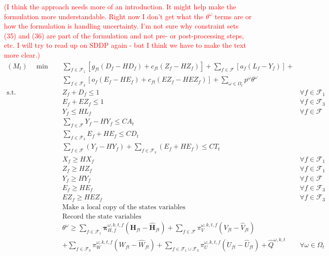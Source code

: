 \documentclass[12pt]{article}
\begin{document}
	\newline
	\textcolor{red}{(I think the approach needs more of an introduction.  It might help make the formulation more understandable.  Right now I don't get what the $\theta^\omega$ terms are or how the formulation is handling uncertainty.  I'm not sure why constraint sets (35) and (36) are part of the formulation and not pre- or post-processing steps, etc.  I will try to read up on SDDP again - but I think we have to make the text more clear.)}
	\begin{align}
		(M_t)\quad \min \quad & \sum_{f \in \mathcal{F}_1} \left[ g_{ft} (D_f - HD_f) + c_{ft} (Z_f - HZ_f) \right] + \sum_{f \in \mathcal{F}} \left[ a_f (L_f - Y_f)\right] + & \nonumber \\
		& \sum_{f \in \mathcal{F}_3} \left[ o_f(E_f - HE_f) + c_{ft}(EZ_f - HEZ_f)\right] + \sum_{\omega \in \Omega_t} p^\omega \theta^\omega &\\
		\text{s.t.} \quad & Z_f + D_f \leq 1 & \forall f \in \mathcal{F}_1\\
		& E_f + EZ_f \leq 1 & \forall f \in \mathcal{F}_3\\
		& Y_f \leq HL_f & \forall f \in \mathcal{F}\\
		& \sum_{f \in \mathcal{F}} Y_f - HY_f \leq CA_t &\\
		& \sum_{f \in \mathcal{F}_3} E_f + HE_f \leq CD_t &\\
		& \sum_{f \in \mathcal{F}} (Y_f - HY_f) + \sum_{f \in \mathcal{F}_3} (E_f + HE_f) \leq CT_t &\\
		& X_f \geq HX_f & \forall f \in \mathcal{F}_1\\
		& Z_f \geq HZ_f & \forall f \in \mathcal{F}_1\\
		& Y_f \geq HY_f & \forall f \in \mathcal{F}\\
		& E_f \geq HE_f & \forall f \in \mathcal{F}_3\\
		& EZ_f \geq HEZ_f & \forall f \in \mathcal{F}_3\\
		& \text{Make a local copy of the states variables}& \label{inheritCon}\\
		& \text{Record the state variables}& \label{passDown}\\
		& \theta^\omega \geq \sum_{f \in \mathcal{F}_1} \mathbf{\pi}_{H,f}^{\omega,k,t,f} (\mathbf{H}_{ft} - \hat{\mathbf{H}}_{ft}) + \sum_{f \in \mathcal{F}}\pi_{V}^{\omega,k,t,f} (V_{ft} - \hat{V}_{ft}) & \nonumber\\
		& + \sum_{f \in \mathcal{F}_3} \pi_{W}^{\omega,k,t,f} (W_{ft} - \hat{W}_{ft}) + \sum_{f \in \mathcal{F}_1 \cup \mathcal{F}_3} \pi_{U}^{\omega,k,t,f} (U_{ft} - \hat{U}_{ft}) + \hat{Q}^{\omega,k,t} & \forall \omega \in \Omega_t
	\end{align}
\end{document}
